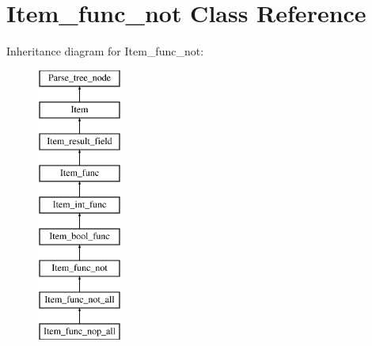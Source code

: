 \hypertarget{classItem__func__not}{}\section{Item\+\_\+func\+\_\+not Class Reference}
\label{classItem__func__not}
Inheritance diagram for Item\+\_\+func\+\_\+not\+:\begin{figure}[H]
\begin{center}
\leavevmode
\includegraphics[height=9.000000cm]{classItem__func__not}
\end{center}
\end{figure}
